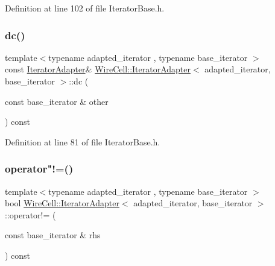Definition at line 102 of file Iterator\+Base.\+h.

\mbox{\label{class_wire_cell_1_1_iterator_adapter_a1a14d011a73fdf78031443584d3e86e0}} 
\subsubsection{\texorpdfstring{dc()}{dc()}}
{\footnotesize\ttfamily template$<$typename adapted\+\_\+iterator , typename base\+\_\+iterator $>$ \\
const \hyperlink{class_wire_cell_1_1_iterator_adapter}{Iterator\+Adapter}\& \hyperlink{class_wire_cell_1_1_iterator_adapter}{Wire\+Cell\+::\+Iterator\+Adapter}$<$ adapted\+\_\+iterator, base\+\_\+iterator $>$\+::dc (\begin{DoxyParamCaption}\item[{const base\+\_\+iterator \&}]{other }\end{DoxyParamCaption}) const\hspace{0.3cm}{\ttfamily [inline]}}



Definition at line 81 of file Iterator\+Base.\+h.

\mbox{\label{class_wire_cell_1_1_iterator_adapter_a8c609990561562aeae2069a949db4932}} 
\subsubsection{\texorpdfstring{operator"!=()}{operator!=()}}
{\footnotesize\ttfamily template$<$typename adapted\+\_\+iterator , typename base\+\_\+iterator $>$ \\
bool \hyperlink{class_wire_cell_1_1_iterator_adapter}{Wire\+Cell\+::\+Iterator\+Adapter}$<$ adapted\+\_\+iterator, base\+\_\+iterator $>$\+::operator!= (\begin{DoxyParamCaption}\item[{const base\+\_\+iterator \&}]{rhs }\end{DoxyParamCaption}) const\hspace{0.3cm}{\ttfamily [inline]}}




